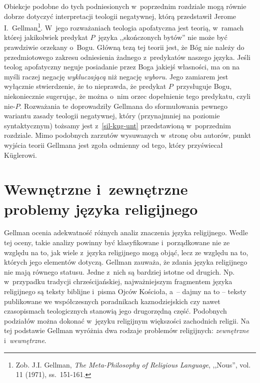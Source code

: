 Obiekcje podobne do tych podniesionych w~poprzednim rozdziale mogą równie dobrze dotyczyć interpretacji teologii negatywnej, którą przedstawił Jerome I.~Gellman\footnote{Zob. J.I. Gellman, \textit{The Meta-Philosophy of Religious Language}, ,,Nous'', vol. 11 (1971), ss.~151-161.}. W~jego rozważaniach teologia apofatyczna jest teorią, w~ramach której jakikolwiek predykat $P$~języka ,,skończonych bytów'' nie może być prawdziwie orzekany o~Bogu. Główną tezą tej teorii jest, że Bóg nie należy do przedmiotowego zakresu odniesienia żadnego z~predykatów naszego języka. Jeśli teolog apofatyczny neguje posiadanie przez Boga jakiejś własności, ma on na myśli raczej negację \textit{wykluczającą} niż negację \textit{wyboru}. Jego zamiarem jest wyłącznie stwierdzenie, że to nieprawda, że predykat $P$~przysługuje Bogu, niekoniecznie sugerując, że można o~nim orzec dopełnienie tego predykatu, czyli nie-$P$. Rozważania te doprowadziły Gellmana do sformułowania pewnego wariantu zasady teologii negatywnej, który (przynajmniej na poziomie syntaktycznym) tożsamy jest z~\ref{sil-kug-unt} przedstawioną w~poprzednim rozdziale. Mimo podobnych zarzutów wysuwanych w~stronę obu autorów, punkt wyjścia teorii Gellmana jest zgoła odmienny od tego, który przyświecał Küglerowi.


\section{Wewnętrzne i~zewnętrzne problemy języka religijnego}

Gellman ocenia adekwatność różnych analiz znaczenia języka religijnego. Wedle tej oceny, takie analizy powinny być klasyfikowane i~porządkowane nie ze względu na to, jak wiele z~języka religijnego mogą objąć, lecz ze względu na to, których jego elementów dotyczą. Gellman zauważa, że zdania języka religijnego nie mają równego statusu. Jedne z~nich są bardziej istotne od drugich. Np. w~przypadku tradycji chrześcijańskiej, najważniejszym fragmentem języka religijnego są teksty biblijne i~pisma Ojców Kościoła, a~-- dajmy na to -- teksty publikowane we współczesnych poradnikach kaznodziejskich czy nawet czasopismach teologicznych stanowią jego drugorzędną część. Podobnych podziałów można dokonać w~języku religijnym większości zachodnich religii. Na tej podstawie Gellman wyróżnia dwa rodzaje problemów religijnych: \textit{zewnętrzne} i~\textit{wewnętrzne}.

